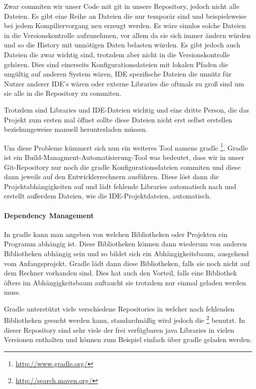 Zwar commiten wir unser Code mit git in unsere Repository, jedoch nicht alle Dateien. Es gibt eine Reihe an Dateien die nur temporär sind und beispielsweise bei jedem Kompiliervorgang neu erzeugt werden. Es wäre sinnlos solche Dateien in die Versionskontrolle aufzunehmen, vor allem da sie sich immer ändern würden und so die History mit unnötigen Daten belasten würden. Es gibt jedoch auch Dateien die zwar wichtig sind, trotzdem aber nicht in die Versionskontrolle gehören. Dies sind einerseits Konfigurationsdateien mit lokalen Pfaden die ungültig auf anderen System wären, IDE spezifische Dateien die unnütz für Nutzer anderer IDE's wären oder externe Libraries die oftmals zu groß sind um sie alle in die Repository zu commiten.

Trotzdem sind Libraries und IDE-Dateien wichtig und eine dritte Person, die das Projekt zum ersten mal öffnet sollte diese Dateien nicht erst selbst erstellen beziehungsweise manuell herunterladen müssen.

Um diese Probleme kümmert sich nun ein weiteres Tool namens gradle \footnote{\url{http://www.gradle.org/}}. Gradle ist ein Build-Managment-Automatisierung-Tool was bedeutet, dass wir in unser Git-Repository nur noch die gradle Konfigurationsdateien commiten und diese dann jeweils auf den Entwicklerrechnern ausführen. Diese löst dann die Projektabhängigkeiten auf und lädt fehlende Libraries automatisch nach und erstellt außerdem Dateien, wie die IDE-Projektdateien, automatisch.

\paragraph{Dependency Management}

In gradle kann man angeben von welchen Bibliotheken oder Projekten ein Programm abhängig ist. Diese Bibliotheken können dann wiederum von anderen Bibliotheken abhängig sein und so bildet sich ein Abhängigkeitsbaum, ausgehend vom Anfangsprojekt.
Gradle lädt dann diese Bibliotheken, falls sie noch nicht auf dem Rechner vorhanden sind. Dies hat auch den Vorteil, falls eine Bibliothek öfters im Abhängigkeitsbaum auftaucht sie trotzdem nur einmal geladen werden muss.\cite[S. 55]{BATWG}

Gradle unterstützt viele verschiedene Repositories in welcher nach fehlenden Bibliotheken gesucht werden kann, standardmäßig wird jedoch die  \footnote{\url{http://search.maven.org/}} benutzt.
In dieser Repository sind sehr viele der frei verfügbaren java Libraries in vielen Versionen enthalten und können zum Beispiel einfach über gradle geladen werden.

